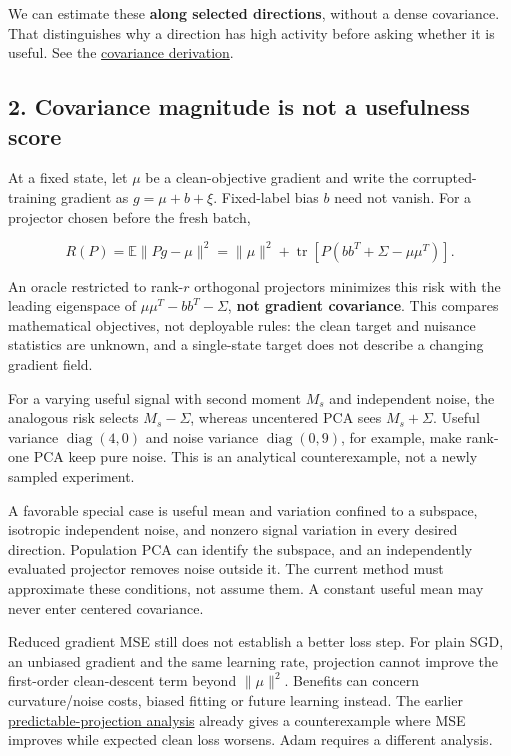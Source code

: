 \documentclass[
  british,
  10pt,
  a4paper,
]{article}
\begin{document}
We can estimate these \textbf{along selected directions}, without a
dense covariance.\allowbreak{} That distinguishes why a direction has
high activity before asking whether it is useful. See the
\href{../analysis/mathematical-followup-covariance.md}{covariance
derivation}.

\subsection{2. Covariance magnitude is not a usefulness
score}\label{mathematics--covariance-magnitude-is-not-a-usefulness-score}

At a fixed state, let \(\mu\) be a clean-\allowbreak{}objective gradient
and write the corrupted-\allowbreak{}training gradient as
\(g=\mu+b+\xi\). Fixed-\allowbreak{}label bias \(b\) need not vanish.
For a projector chosen before the fresh batch,

\[
R(P)=\mathbb E\|Pg-\mu\|^2
=\|\mu\|^2+\operatorname{tr}[P(bb^T+\Sigma-\mu\mu^T)].
\]

An oracle restricted to rank-\(r\) orthogonal projectors minimizes this
risk with the leading eigenspace of \(\mu\mu^T-bb^T-\Sigma\),
\textbf{not gradient covariance}. This compares mathematical
objectives,\allowbreak{} not deployable rules: the clean target and
nuisance statistics are unknown, and a single-\allowbreak{}state target
does not describe a changing gradient field.

For a varying useful signal with second moment \(M_s\) and independent
noise, the analogous risk selects \(M_s-\Sigma\), whereas uncentered PCA
sees \(M_s+\Sigma\). Useful variance \(\operatorname{diag}(4,0)\) and
noise variance \(\operatorname{diag}(0,9)\), for example, make rank-one
PCA keep pure noise. This is an analytical
counterexamp\allowbreak{}le,\allowbreak{} not a newly sampled
experiment.\allowbreak{}

A favorable special case is useful mean and variation confined to a
subspace, isotropic independent noise, and nonzero signal variation in
every desired direction. Population PCA can identify the subspace, and
an independently evaluated projector removes noise outside it. The
current method must approximate these conditions,\allowbreak{} not
assume them. A constant useful mean may never enter centered
covariance.\allowbreak{}

Reduced gradient MSE still does not establish a better loss step. For
plain SGD, an unbiased gradient and the same learning rate, projection
cannot improve the first-\allowbreak{}order clean-\allowbreak{}descent
term beyond \(\|\mu\|^2\). Benefits can concern
curvature/\allowbreak{}noise costs, biased fitting or future learning
instead. The earlier
\href{../continuation/predictable-projection-theory.md}{predictable-\allowbreak{}projection
analysis} already gives a counterexample where MSE improves while
expected clean loss worsens. Adam requires a different analysis.
\end{document}
